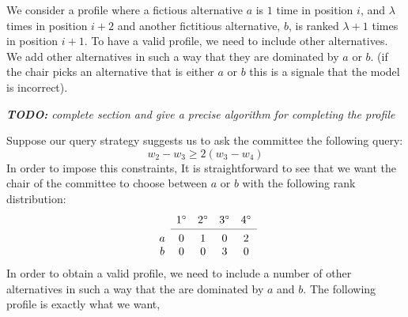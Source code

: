 We consider a profile where a fictious alternative $a$ is $1$ time in position $i$, and $\lambda$ times 
in position $i+2$ and another fictitious alternative, $b$, is ranked $\lambda+1$ times in position $i+1$.
To have a valid profile, we need to include other alternatives.
We add other alternatives in such a way that they are dominated by $a$ or $b$. 
(if the chair picks an alternative that is either $a$ or $b$ this is a signale that the model is incorrect).

\vspace{1cm}
{\em {\bf TODO:} complete section and give a precise algorithm for completing the profile}
\vspace{1cm}

\begin{example}
Suppose our query strategy suggests us to ask the committee the following query:
\[ w_{2} - w_{3} \geq 2(w_{3} - w_{4}) \]
In order to impose this constraints,
It is straightforward to see that we want the  chair of the committee to choose between $a$ or $b$ with the following rank distribution:
\[
\begin{array}{ccccc}
& 1^\circ
& 2^\circ
& 3^\circ
& 4^\circ \\
\cmidrule{2-5}
a & 0& 1& 0& 2 \\
b& 0& 0& 3& 0 \\
\end{array}
\]
In order to obtain a valid profile, we need to include a number of other alternatives in such a way that the are dominated by $a$ and $b$.
The following profile is exactly what we want,


\end{example}
